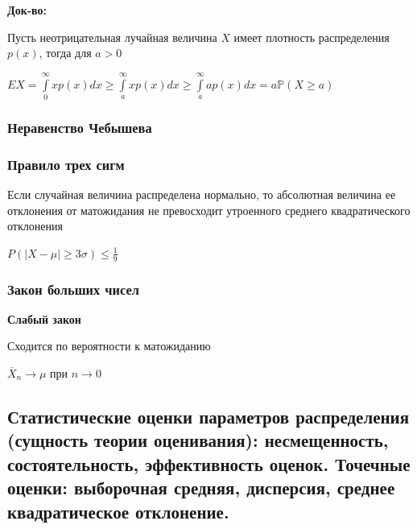 \documentclass{article}
\begin{document}
{\bf Док-во:}

Пусть неотрицательная лучайная величина $X$ имеет плотность распределения $p(x)$, тогда для $a > 0$

$EX = \int\limits_{0}^{\infty} xp(x)dx \ge \int\limits_{a}^{\infty}xp(x)dx \ge \int\limits_{a}^{\infty}ap(x)dx = a \mathbb{P}(X \ge a)$


\subsubsection{Неравенство Чебышева}



\subsubsection{Правило трех сигм}

Если случайная величина распределена нормально, то абсолютная величина ее отклонения от матожидания не превосходит утроенного среднего квадратического отклонения

$P(|X - \mu| \ge 3 \sigma) \le \frac{1}{9}$


\subsubsection{Закон больших чисел}


{\bf Слабый закон}

Сходится по вероятности к матожиданию 

$\overline{X}_n \rightarrow \mu$ при $n \rightarrow 0$

\subsection{ Статистические оценки параметров распределения (сущность теории оценивания): несмещенность, состоятельность, эффективность оценок. Точечные оценки: выборочная средняя, дисперсия, среднее квадратическое отклонение.}
\end{document}
